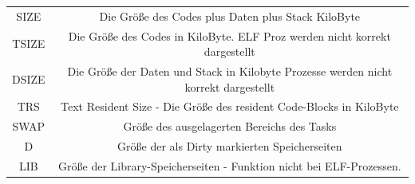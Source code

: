 \documentclass[a4paper]{article}
\begin{document}
\begin{tabular}{c|c}
    SIZE    & Die Größe des Codes plus Daten plus Stack KiloByte                                                                                                                                                                                                                                                                                                                         \\
    TSIZE   & Die Größe des Codes in KiloByte. ELF Proz werden nicht korrekt dargestellt                                                                                                                                                                                                                                                                                                 \\
    DSIZE   & Die Größe der Daten und Stack in Kilobyte Prozesse werden nicht korrekt dargestellt                                                                                                                                                                                                                                                                                        \\
    TRS     & Text Resident Size - Die Größe des resident Code-Blocks in KiloByte                                                                                                                                                                                                                                                                                                        \\
    SWAP    & Größe des ausgelagerten Bereichs des Tasks                                                                                                                                                                                                                                                                                                                                 \\
    D       & Größe der als Dirty markierten Speicherseiten                                                                                                                                                                                                                                                                                                                              \\
    LIB     & Größe der Library-Speicherseiten - Funktion nicht bei ELF-Prozessen.                                                                                                                                                                                                                                                                                                       \\

\end{tabular}
\end{document}
